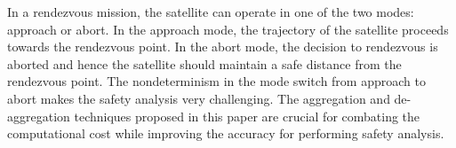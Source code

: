 %
In a rendezvous mission, the satellite can operate in one of the two modes: approach or abort. 
%
In the approach mode, the trajectory of the satellite proceeds towards the rendezvous point. 
%
In the abort mode, the decision to rendezvous is aborted and hence the satellite should maintain a safe distance from the rendezvous point. 
%
%
%
The nondeterminism in the mode switch from approach to abort makes the safety analysis very challenging.
%
%
%
%
The aggregation and de-aggregation techniques proposed in this paper are crucial for combating the computational cost while improving the accuracy for performing safety analysis.
%

